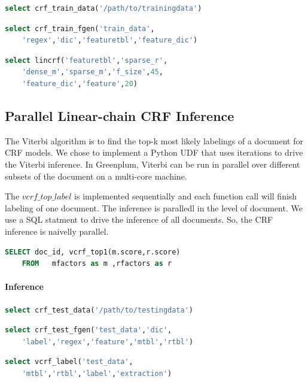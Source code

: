 \documentclass[11pt,letterpaper]{article}
\begin{document}
\begin{lstlisting}[language=SQL,gobble=4]
    select crf_train_data('/path/to/trainingdata')
\end{lstlisting}

\begin{lstlisting}[language=SQL,gobble=4]
    select crf_train_fgen('train_data', 
    'regex','dic','featuretbl','feature_dic')
\end{lstlisting}

\begin{lstlisting}[language=SQL,gobble=4]
    select lincrf('featuretbl','sparse_r',
    'dense_m','sparse_m','f_size',45, 
    'feature_dic','feature',20)
\end{lstlisting}

\subsection{Parallel Linear-chain CRF Inference}
 The Viterbi algorithm is to find the top-k most likely labelings of a document 
for CRF models. 
We chose to implement a Python UDF that uses iterations to drive the Viterbi inference. 
In Greenplum, Viterbi can be run in parallel over different subsets 
of the document on a multi-core machine.

The $vcrf\_top\_label$ is implemented sequentially and each function call will finish labeling of one document. 
The inference is paralledl in the level of document. We use a SQL statment to drive the inference of all documents.
So, the CRF inference is naivelly parallel. 
\begin{lstlisting}[language=SQL,gobble=4]
    SELECT doc_id, vcrf_top1(m.score,r.score)
    FROM   mfactors as m ,rfactors as r
\end{lstlisting}

\paragraph{Inference}
\begin{lstlisting}[language=SQL,gobble=4]
    select crf_test_data('/path/to/testingdata')
\end{lstlisting}

\begin{lstlisting}[language=SQL,gobble=4]
    select crf_test_fgen('test_data','dic',
    'label','regex','feature','mtbl','rtbl')
\end{lstlisting}

\begin{lstlisting}[language=SQL,gobble=4]
    select vcrf_label('test_data', 
    'mtbl','rtbl','label','extraction')
\end{lstlisting}
\end{document}
